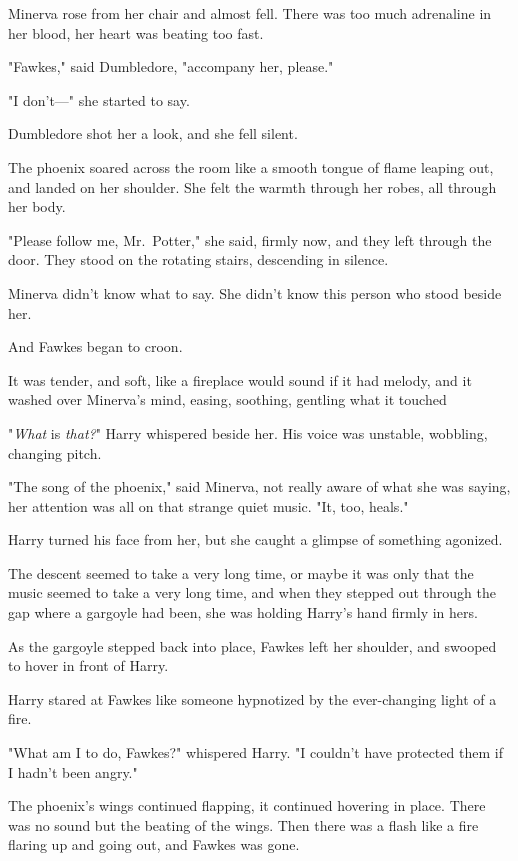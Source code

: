 Minerva rose from her chair and almost fell. There was too much adrenaline in
her blood, her heart was beating too fast.

"Fawkes," said Dumbledore, "accompany her, please."

"I don't\mbox{---}" she started to say.

Dumbledore shot her a look, and she fell silent.

The phoenix soared across the room like a smooth tongue of flame leaping out,
and landed on her shoulder. She felt the warmth through her robes, all through
her body.

"Please follow me, Mr.~Potter," she said, firmly now, and they left through the
door.
\sbreak
They stood on the rotating stairs, descending in silence.

Minerva didn't know what to say. She didn't know this person who stood beside
her.

And Fawkes began to croon.

It was tender, and soft, like a fireplace would sound if it had melody, and it
washed over Minerva's mind, easing, soothing, gentling what it touched{\el}

"\emph{What} is \emph{that?}" Harry whispered beside her. His voice was
unstable, wobbling, changing pitch.

"The song of the phoenix," said Minerva, not really aware of what she was
saying, her attention was all on that strange quiet music. "It, too, heals."

Harry turned his face from her, but she caught a glimpse of something agonized.

The descent seemed to take a very long time, or maybe it was only that the
music seemed to take a very long time, and when they stepped out through the
gap where a gargoyle had been, she was holding Harry's hand firmly in hers.

As the gargoyle stepped back into place, Fawkes left her shoulder, and swooped
to hover in front of Harry.

Harry stared at Fawkes like someone hypnotized by the ever-changing light of a
fire.

"What am I to do, Fawkes?" whispered Harry. "I couldn't have protected them if
I hadn't been angry."

The phoenix's wings continued flapping, it continued hovering in place. There
was no sound but the beating of the wings. Then there was a flash like a fire
flaring up and going out, and Fawkes was gone.

